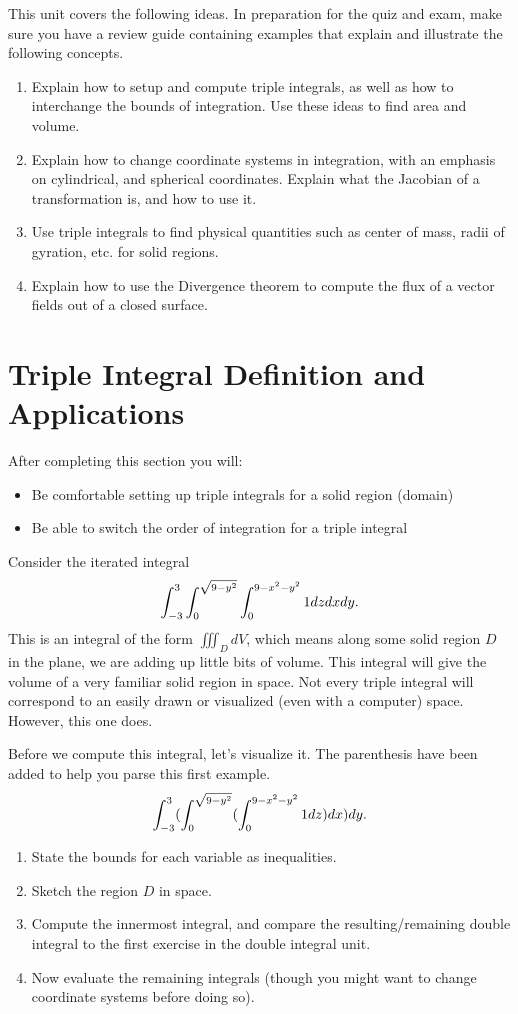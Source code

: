
\noindent 
This unit covers the following ideas. In preparation for the quiz and exam, make sure you have a review guide containing examples that explain and illustrate the following concepts.  
\begin{enumerate}
\item Explain how to setup and compute triple integrals, as well as how to interchange the bounds of integration. Use these ideas to find area and volume.
\item Explain how to change coordinate systems in integration, with an emphasis on cylindrical, and spherical coordinates. Explain what the Jacobian of a transformation is, and how to use it.
\item Use triple integrals to find physical quantities such as center of mass, radii of gyration, etc. for solid regions.
\item Explain how to use the Divergence theorem to compute the flux of a vector fields out of a closed surface.
\end{enumerate}

\newpage


\section{Triple Integral Definition and Applications}

After completing this section you will:
\begin{itemize}
\item Be comfortable setting up triple integrals for a solid region (domain)
\item Be able to switch the order of integration for a triple integral
\end{itemize}


Consider the iterated integral $$\displaystyle \int_{-3}^3 \int_0^{\sqrt{9-y^2}}\int_0^{9-x^2-y^2} 1dzdxdy.$$ This is an integral of the form $\iiint_D dV$, which means along some solid region $D$ in the plane, we are adding up little bits of volume. This integral will give the volume of a very familiar solid region in space. Not every triple integral will correspond to an easily drawn or visualized (even with a computer) space. However, this one does.
\begin{problem}
Before we compute this integral, let's visualize it. The parenthesis have been added to help you parse this first example.
$$\displaystyle \int_{-3}^3 (\int_0^{\sqrt{9-y^2}} (\int_0^{9-x^2-y^2} 1dz) dx ) dy.$$
\begin{enumerate}
	\item State the bounds for each variable as inequalities.
	\item Sketch the region $D$ in space.  
	\item Compute the innermost integral, and compare the resulting/remaining double integral to the first exercise in the double integral unit. 
	\item Now evaluate the remaining integrals (though you might want to change coordinate systems before doing so).
\end{enumerate}
\end{problem}


